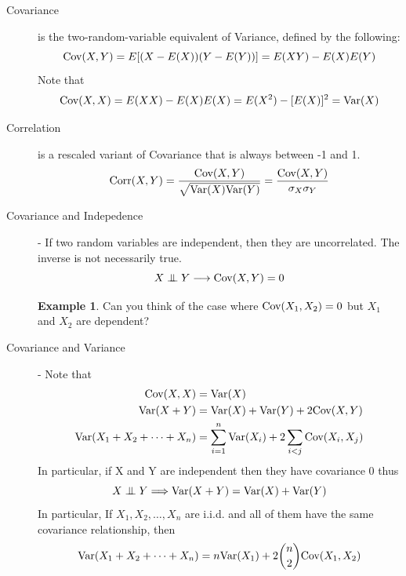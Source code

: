 \documentclass[11pt]{article}
\theoremstyle{definition}
\newtheorem{example}[theo]{\color{Maroon} Example}
\theoremstyle{remark}
\newcommand{\Bern}{\text{Bern}}
\newcommand{\cov}{\textnormal{Cov}}
\newcommand{\corr}{\textnormal{Corr}}
\renewcommand{\var}{\textnormal{Var}}
\newcommand\independent{\protect\mathpalette{\protect\independenT}{\perp}}
\def\independenT#1#2{\mathrel{\setbox0\hbox{$#1#2$}%
    \copy0\kern-\wd0\mkern4mu\box0}}
\begin{document}
\begin{description}
\item [Covariance] is the two-random-variable equivalent of Variance, defined by the following:
	\[\cov(X, Y) = E[(X - E(X))(Y - E(Y))] = E(XY) - E(X)E(Y)\]
	Note that 
	\[\cov(X, X) = E(XX) - E(X)E(X) =  E(X^2) - [E(X)]^2 = \var(X)\]
\item [Correlation] is a rescaled variant of Covariance that is always between -1 and 1.
	\[\corr(X, Y) = \frac{\cov(X, Y)}{\sqrt{\var(X)\var(Y)}} = \frac{\cov(X, Y)}{\sigma_X\sigma_Y}\]
\item [Covariance and Indepedence] - If two random variables are independent, then they are uncorrelated. The inverse is not necessarily true. 
	\[X \independent Y \longrightarrow \cov(X, Y) = 0\]

\begin{example} Can you think of the case where $\cov(X_1,X_2)=0$ but $X_1$ and $X_2$ are dependent?

\vspace{1 in}


\end{example}

\item [Covariance and Variance] - Note that
	\begin{align*}
		\cov(X, X) &= \var(X) \\
		\var(X + Y) &= \var(X) + \var(Y) + 2\cov(X, Y) \\
		\var(X_1 + X_2 + \dots + X_n ) &= \sum_{i = 1}^{n}\var(X_i) + 2\sum_{i < j} \cov(X_i, X_j)
	\end{align*}
	In particular, if X and Y are independent then they have covariance 0 thus
	\[X \independent Y \Longrightarrow \var(X + Y) = \var(X) + \var(Y)\]
	In particular, If $X_1, X_2, \dots, X_n$ are i.i.d. and all of them have the same covariance relationship, then 
	\[\var(X_1 + X_2 + \dots + X_n ) = n\var(X_1) + 2{n \choose 2}\cov(X_1, X_2)\]
	

\end{description}
\end{document}
